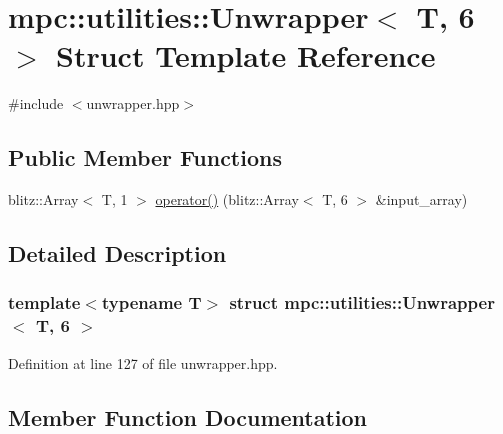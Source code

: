 \hypertarget{structmpc_1_1utilities_1_1_unwrapper_3_01_t_00_016_01_4}{}\section{mpc\+:\+:utilities\+:\+:Unwrapper$<$ T, 6 $>$ Struct Template Reference}
\label{structmpc_1_1utilities_1_1_unwrapper_3_01_t_00_016_01_4}


{\ttfamily \#include $<$unwrapper.\+hpp$>$}

\subsection*{Public Member Functions}
\begin{DoxyCompactItemize}
\item 
blitz\+::\+Array$<$ T, 1 $>$ \mbox{\hyperlink{structmpc_1_1utilities_1_1_unwrapper_3_01_t_00_016_01_4_a337610b2bc0037a352576ba060636460}{operator()}} (blitz\+::\+Array$<$ T, 6 $>$ \&input\+\_\+array)
\end{DoxyCompactItemize}


\subsection{Detailed Description}
\subsubsection*{template$<$typename T$>$\newline
struct mpc\+::utilities\+::\+Unwrapper$<$ T, 6 $>$}



Definition at line 127 of file unwrapper.\+hpp.



\subsection{Member Function Documentation}
\mbox{\label{structmpc_1_1utilities_1_1_unwrapper_3_01_t_00_016_01_4_a337610b2bc0037a352576ba060636460}} 
